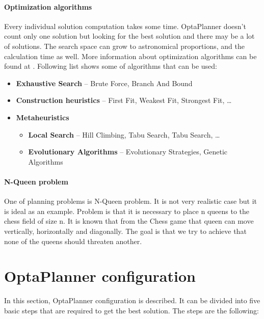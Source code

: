 \paragraph{Optimization algorithms}\label{optimalAlg}
Every individual solution computation takes some time. OptaPlanner doesn't count only one solution but looking for the best solution and there may be a lot of solutions. The search space can grow to astronomical proportions, and the calculation time as well. More information about optimization algorithms can be found at \cite{OptaPlannerDoc}. Following list shows some of algorithms that can be used:
\begin{itemize}
\item \textbf{Exhaustive Search} -- Brute Force,  Branch And Bound
\item \textbf{Construction heuristics} --  First Fit, Weakest Fit,  Strongest Fit, \dots
\item \textbf{Metaheuristics}
\begin{itemize}
\item \textbf{Local Search} --  Hill Climbing, Tabu Search, Tabu Search, \dots
\item \textbf{Evolutionary Algorithms} -- Evolutionary Strategies, Genetic Algorithms
\end{itemize}
\end{itemize}

\paragraph{N-Queen problem}
One of planning problems is N-Queen problem. It is not very realistic case but it is ideal as an example. Problem is that it is necessary to place n queens to the chess field of size n. It is known that from the Chess game that queen can move vertically, horizontally and diagonally. The goal is that we try to achieve that none of the queens should threaten another.

\section{OptaPlanner configuration}\label{plannerConf}
In this section, OptaPlanner configuration is described. It can be divided into five basic steps that are required to get the best solution. The steps are the following:

